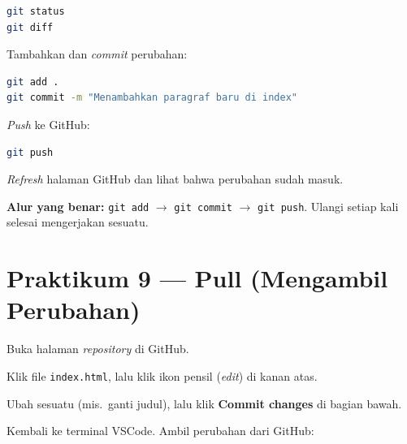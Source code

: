 \begin{lstlisting}[language=bash, caption={Melihat perubahan}, label={lst:git-diff}]
git status
git diff
\end{lstlisting}

\begin{langkah}
  \item Tambahkan dan \emph{commit} perubahan:
\end{langkah}

\begin{lstlisting}[language=bash, caption={Commit perubahan baru}, label={lst:git-commit-2}]
git add .
git commit -m "Menambahkan paragraf baru di index"
\end{lstlisting}

\begin{langkah}
  \item \emph{Push} ke GitHub:
\end{langkah}

\begin{lstlisting}[language=bash, caption={Push ke GitHub}, label={lst:git-push-2}]
git push
\end{lstlisting}

\begin{langkah}
  \item \emph{Refresh} halaman GitHub dan lihat bahwa perubahan sudah masuk.
\end{langkah}

\begin{catatan}
\textbf{Alur yang benar:} \texttt{git add} $\rightarrow$ \texttt{git commit} $\rightarrow$ \texttt{git push}. Ulangi setiap kali selesai mengerjakan sesuatu.
\end{catatan}

\section{Praktikum 9 --- Pull (Mengambil Perubahan)}
\label{sec:git-praktik-9}

\begin{langkah}
  \item Buka halaman \emph{repository} di GitHub.
  \item Klik file \texttt{index.html}, lalu klik ikon pensil (\emph{edit}) di kanan atas.
  \item Ubah sesuatu (mis.\ ganti judul), lalu klik \textbf{Commit changes} di bagian bawah.
  \item Kembali ke terminal VSCode. Ambil perubahan dari GitHub:
\end{langkah}

